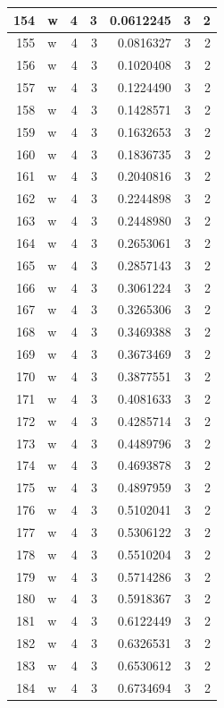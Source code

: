 \documentclass[
  letterpaper,
  DIV=11,
  numbers=noendperiod]{scrreprt}
\begin{document}
\begin{table}
\begin{tabular}[t]{r|l|r|r|r|r|r}
\hline
154 & w & 4 & 3 & 0.0612245 & 3 & 2\\
\hline
155 & w & 4 & 3 & 0.0816327 & 3 & 2\\
\hline
156 & w & 4 & 3 & 0.1020408 & 3 & 2\\
\hline
157 & w & 4 & 3 & 0.1224490 & 3 & 2\\
\hline
158 & w & 4 & 3 & 0.1428571 & 3 & 2\\
\hline
159 & w & 4 & 3 & 0.1632653 & 3 & 2\\
\hline
160 & w & 4 & 3 & 0.1836735 & 3 & 2\\
\hline
161 & w & 4 & 3 & 0.2040816 & 3 & 2\\
\hline
162 & w & 4 & 3 & 0.2244898 & 3 & 2\\
\hline
163 & w & 4 & 3 & 0.2448980 & 3 & 2\\
\hline
164 & w & 4 & 3 & 0.2653061 & 3 & 2\\
\hline
165 & w & 4 & 3 & 0.2857143 & 3 & 2\\
\hline
166 & w & 4 & 3 & 0.3061224 & 3 & 2\\
\hline
167 & w & 4 & 3 & 0.3265306 & 3 & 2\\
\hline
168 & w & 4 & 3 & 0.3469388 & 3 & 2\\
\hline
169 & w & 4 & 3 & 0.3673469 & 3 & 2\\
\hline
170 & w & 4 & 3 & 0.3877551 & 3 & 2\\
\hline
171 & w & 4 & 3 & 0.4081633 & 3 & 2\\
\hline
172 & w & 4 & 3 & 0.4285714 & 3 & 2\\
\hline
173 & w & 4 & 3 & 0.4489796 & 3 & 2\\
\hline
174 & w & 4 & 3 & 0.4693878 & 3 & 2\\
\hline
175 & w & 4 & 3 & 0.4897959 & 3 & 2\\
\hline
176 & w & 4 & 3 & 0.5102041 & 3 & 2\\
\hline
177 & w & 4 & 3 & 0.5306122 & 3 & 2\\
\hline
178 & w & 4 & 3 & 0.5510204 & 3 & 2\\
\hline
179 & w & 4 & 3 & 0.5714286 & 3 & 2\\
\hline
180 & w & 4 & 3 & 0.5918367 & 3 & 2\\
\hline
181 & w & 4 & 3 & 0.6122449 & 3 & 2\\
\hline
182 & w & 4 & 3 & 0.6326531 & 3 & 2\\
\hline
183 & w & 4 & 3 & 0.6530612 & 3 & 2\\
\hline
184 & w & 4 & 3 & 0.6734694 & 3 & 2\\

\end{tabular}
\end{table}
\end{document}
